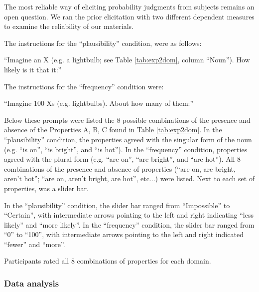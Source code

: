 \documentclass{llncs} %
\begin{document}
The most reliable way of eliciting probability judgments from subjects remains an open question. We ran the prior elicitation with two different dependent measures to examine the reliability of our materials.
%

The instructions for the ``plausibility'' condition, were as follows:

``Imagine an X (e.g. a lightbulb; see Table \ref{tab:exp2dom}, column ``Noun''). How likely is it that it:''

The instructions for the ``frequency'' condition were:

``Imagine 100 Xs (e.g. lightbulbs). About how many of them:''

Below these prompts were listed the 8 possible combinations of the presence and absence of the Properties A, B, C found in Table \ref{tab:exp2dom}. In the ``plausibility'' condition, the properties agreed with the singular form of the noun (e.g. ``is on'', ``is bright'', and ``is hot''). In the ``frequency'' condition, properties agreed with the plural form (e.g. ``are on'', ``are bright'', and ``are hot''). All 8 combinations of the presence and absence of properties (``are on, are bright, aren't hot''; ``are on, aren't bright, are hot'', etc...) were listed. Next to each set of properties, was a slider bar.

In the ``plausibility'' condition, the slider bar ranged from ``Impossible'' to ``Certain'', with intermediate arrows pointing to the left and right indicating ``less likely'' and ``more likely''. In the ``frequency'' condition, the slider bar ranged from ``0'' to ``100'', with intermediate arrows pointing to the left and right indicated ``fewer'' and ``more''. 

Participants rated all 8 combinations of properties for each domain.

\subsubsection{Data analysis}
\end{document}
